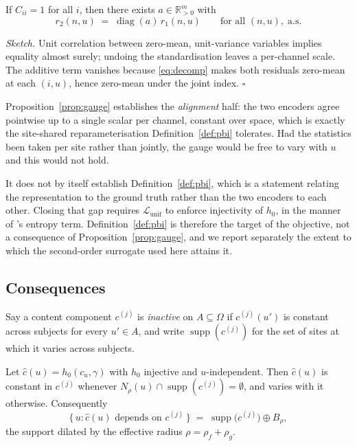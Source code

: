 \begin{proposition}
\label{prop:gauge}
If $C_{ii} = 1$ for all $i$, then there exists $a \in \mathbb{R}^m_{>0}$ with
\begin{equation}
  r_2(n,u) \;=\; \operatorname{diag}(a)\, r_1(n,u)
  \qquad \text{for all } (n,u), \; \text{a.s.}
\end{equation}
\end{proposition}

\noindent\emph{Sketch.} Unit correlation between zero-mean, unit-variance variables implies
equality almost surely; undoing the standardisation leaves a per-channel scale. The additive
term vanishes because \eqref{eq:decomp} makes both residuals zero-mean at each $(i,u)$, hence
zero-mean under the joint index. \hfill$\square$

Proposition~\ref{prop:gauge} establishes the \emph{alignment} half: the two encoders agree
pointwise up to a single scalar per channel, constant over space, which is exactly the
site-shared reparameterisation Definition~\ref{def:pbi} tolerates. Had the statistics been
taken per site rather than jointly, the gauge would be free to vary with $u$ and this would not
hold.

It does not by itself establish Definition~\ref{def:pbi}, which is a statement relating the
representation to the ground truth rather than the two encoders to each other. Closing that gap
requires $\mathcal{L}_{\mathrm{unif}}$ to enforce injectivity of $h_0$, in the manner of
\citet{yao2024}'s entropy term. Definition~\ref{def:pbi} is therefore the target of the
objective, not a consequence of Proposition~\ref{prop:gauge}, and we report separately the
extent to which the second-order surrogate used here attains it.

\subsection{Consequences}
\label{sec:conseq}

Say a content component $c^{(j)}$ is \emph{inactive} on $A \subseteq \Omega$ if
$c^{(j)}(u')$ is constant across subjects for every $u' \in A$, and write
$\operatorname{supp}(c^{(j)})$ for the set of sites at which it varies across subjects.

\begin{proposition}
\label{prop:support}
Let $\hat c(u) = h_0(c_u, \gamma)$ with $h_0$ injective and $u$-independent. Then $\hat c(u)$ is
constant in $c^{(j)}$ whenever $N_\rho(u) \cap \operatorname{supp}(c^{(j)}) = \emptyset$, and
varies with it otherwise. Consequently
\begin{equation}
  \big\{\, u : \hat c(u) \text{ depends on } c^{(j)} \,\big\}
  \;=\; \operatorname{supp}\big(c^{(j)}\big) \oplus B_\rho ,
\end{equation}
the support dilated by the effective radius $\rho = \rho_f + \rho_g$.
\end{proposition}

